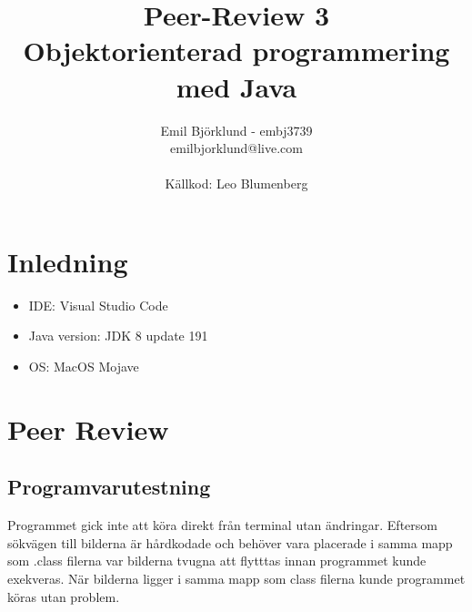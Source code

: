 \documentclass[hidelinks]{article}
\title{Peer-Review 3 \\ Objektorienterad programmering med Java}
\author{Emil Björklund - embj3739 \\ emilbjorklund@live.com \\ \\ Källkod: Leo Blumenberg}
\begin{document}
\maketitle 
\newpage

\section*{Inledning}
\begin {itemize}
\item IDE: Visual Studio Code
\item Java version: JDK 8 update 191
\item OS: MacOS Mojave
\end{itemize}

\section*{Peer Review}
\subsection*{Programvarutestning}
Programmet gick inte att köra direkt från terminal utan ändringar. Eftersom sökvägen till bilderna är hårdkodade och behöver
vara placerade i samma mapp som .class filerna var bilderna tvugna att flytttas innan programmet kunde exekveras.
När bilderna ligger i samma mapp som class filerna kunde programmet köras utan problem.
\end{document}
